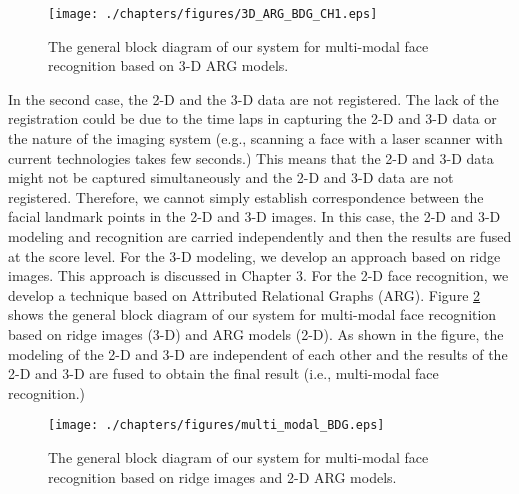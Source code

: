 \begin{figure}
\begin{center}
\texttt{[image: ./chapters/figures/3D\_ARG\_BDG\_CH1.eps]}\\
\caption{The general block diagram of our system for multi-modal
face recognition based on 3-D ARG
models.}\label{fig_3D_ARG_modeling}
\end{center}
\end{figure}

In the second case, the 2-D and the 3-D data are not registered. The
lack of the registration could be due to the time laps in capturing
the 2-D and 3-D data or the nature of the imaging system (e.g.,
scanning a face with a laser scanner with current technologies takes
few seconds.) This means that the 2-D and 3-D data might not be
captured simultaneously and the 2-D and 3-D data are not registered.
Therefore, we cannot simply establish correspondence between the
facial landmark points in the 2-D and 3-D images. In this case, the
2-D and 3-D modeling and recognition are carried independently and
then the results are fused at the score level. For the 3-D modeling,
we develop an approach based on ridge images. This approach is
discussed in Chapter 3. For the 2-D face recognition, we develop a
technique based on Attributed Relational Graphs (ARG). Figure
\ref{fig_gbd_ridge_ARG} shows the general block diagram of our
system for multi-modal face recognition based on ridge images (3-D)
and ARG models (2-D). As shown in the figure, the modeling of the
2-D and 3-D are independent of each other and the results of the 2-D
and 3-D are fused to obtain the final result (i.e., multi-modal face
recognition.)

\begin{figure}
\begin{center}
\texttt{[image: ./chapters/figures/multi\_modal\_BDG.eps]}\\
\caption{The general block diagram of our system for multi-modal
face recognition based on ridge images and 2-D ARG
models.}\label{fig_gbd_ridge_ARG}
\end{center}
\end{figure}

